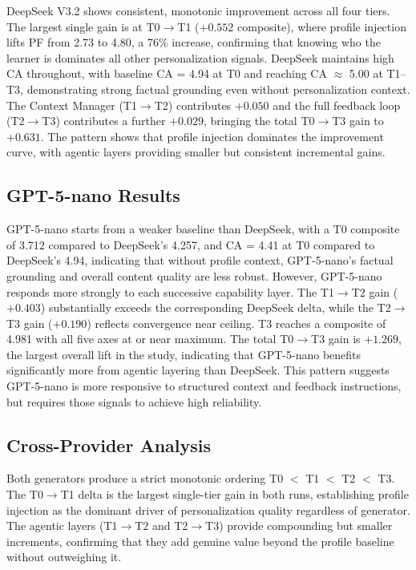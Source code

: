 \documentclass[conference]{IEEEtran}
\begin{document}
DeepSeek V3.2 shows consistent, monotonic improvement across all four tiers. The largest single gain is at T0$\to$T1 ($+0.552$ composite), where profile injection lifts PF from 2.73 to 4.80, a 76\% increase, confirming that knowing who the learner is dominates all other personalization signals. DeepSeek maintains high CA throughout, with baseline CA = 4.94 at T0 and reaching CA $\approx$ 5.00 at T1--T3, demonstrating strong factual grounding even without personalization context. The Context Manager (T1$\to$T2) contributes $+0.050$ and the full feedback loop (T2$\to$T3) contributes a further $+0.029$, bringing the total T0$\to$T3 gain to $+0.631$. The pattern shows that profile injection dominates the improvement curve, with agentic layers providing smaller but consistent incremental gains.

\subsection{GPT-5-nano Results}

GPT-5-nano starts from a weaker baseline than DeepSeek, with a T0 composite of 3.712 compared to DeepSeek's 4.257, and CA = 4.41 at T0 compared to DeepSeek's 4.94, indicating that without profile context, GPT-5-nano's factual grounding and overall content quality are less robust. However, GPT-5-nano responds more strongly to each successive capability layer. The T1$\to$T2 gain ($+0.403$) substantially exceeds the corresponding DeepSeek delta, while the T2$\to$T3 gain ($+0.190$) reflects convergence near ceiling. T3 reaches a composite of 4.981 with all five axes at or near maximum. The total T0$\to$T3 gain is $+1.269$, the largest overall lift in the study, indicating that GPT-5-nano benefits significantly more from agentic layering than DeepSeek. This pattern suggests GPT-5-nano is more responsive to structured context and feedback instructions, but requires those signals to achieve high reliability.

\subsection{Cross-Provider Analysis}

Both generators produce a strict monotonic ordering T0 $<$ T1 $<$ T2 $<$ T3. The T0$\to$T1 delta is the largest single-tier gain in both runs, establishing profile injection as the dominant driver of personalization quality regardless of generator. The agentic layers (T1$\to$T2 and T2$\to$T3) provide compounding but smaller increments, confirming that they add genuine value beyond the profile baseline without outweighing it.
\end{document}
